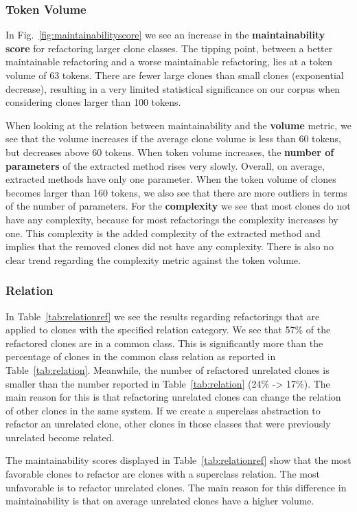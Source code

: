 \subsubsection{Token Volume}
In Fig.~\ref{fig:maintainabilityscore} we see an increase in the \textbf{maintainability score} for refactoring larger clone classes. The tipping point, between a better maintainable refactoring and a worse maintainable refactoring, lies at a token volume of 63 tokens. There are fewer large clones than small clones (exponential decrease), resulting in a very limited statistical significance on our corpus when considering clones larger than 100 tokens.

When looking at the relation between maintainability and the \textbf{volume} metric, we see that the volume increases if the average clone volume is less than 60 tokens, but decreases above 60 tokens. When token volume increases, the \textbf{number of parameters} of the extracted method rises very slowly. Overall, on average, extracted methods have only one parameter. When the token volume of clones becomes larger than 160 tokens, we also see that there are more outliers in terms of the number of parameters. For the \textbf{complexity} we see that most clones do not have any complexity, because for most refactorings the complexity increases by one. This complexity is the added complexity of the extracted method and implies that the removed clones did not have any complexity. There is also no clear trend regarding the complexity metric against the token volume.

\subsubsection{Relation}
In Table~\ref{tab:relationref} we see the results regarding refactorings that are applied to clones with the specified relation category. We see that 57\% of the refactored clones are in a common class. This is significantly more than the percentage of clones in the common class relation as reported in Table~\ref{tab:relation}. Meanwhile, the number of refactored unrelated clones is smaller than the number reported in Table~\ref{tab:relation} (24\% -> 17\%). The main reason for this is that refactoring unrelated clones can change the relation of other clones in the same system. If we create a superclass abstraction to refactor an unrelated clone, other clones in those classes that were previously unrelated become related.

The maintainability scores displayed in Table~\ref{tab:relationref} show that the most favorable clones to refactor are clones with a superclass relation. The most unfavorable is to refactor unrelated clones. The main reason for this difference in maintainability is that on average unrelated clones have a higher volume.

